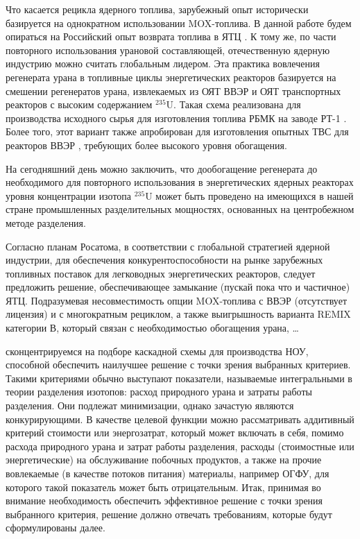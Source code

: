 Что касается рецикла ядерного топлива, зарубежный опыт исторически базируется на однократном использовании MOX-топлива. В данной работе будем опираться на Российский опыт возврата топлива в ЯТЦ \cite{international2003iaea}. К тому же, по части повторного использования урановой составляющей, отечественную ядерную индустрию можно считать глобальным лидером.  Эта практика вовлечения регенерата урана в топливные циклы энергетических реакторов базируется на смешении регенератов урана, извлекаемых из ОЯТ ВВЭР и ОЯТ транспортных реакторов с высоким содержанием $^{235}$U. Такая схема реализована для производства исходного сырья для изготовления топлива РБМК на заводе РТ-1 \cite{volkVozvratUranaIz2010}. Более того, этот вариант также апробирован для изготовления опытных ТВС для реакторов ВВЭР \cite{proselkovAnalizVozmozhnostiIspolzovaniya2003}, требующих более высокого уровня обогащения.

На сегодняшний день можно заключить, что дообогащение регенерата до необходимого для повторного использования в энергетических ядерных реакторах уровня концентрации изотопа $^{235}$U может быть проведено на имеющихся в нашей стране промышленных разделительных мощностях, основанных на центробежном методе разделения. 

Согласно планам Росатома, в соответствии с глобальной стратегией ядерной индустрии, для обеспечения конкурентоспособности на рынке зарубежных топливных поставок для легководных энергетических реакторов, следует предложить решение, обеспечивающее замыкание (пускай пока что и частичное) ЯТЦ. Подразумевая несовместимость опции MOX-топлива с ВВЭР (отсутствует лицензия) и с многократным рециклом, а также выигрышность варианта REMIX категории В, который связан с необходимостью обогащения урана, \dots

сконцентрируемся на подборе каскадной схемы для производства НОУ, способной обеспечить наилучшее решение с точки зрения выбранных критериев. Такими критериями  обычно выступают показатели, называемые интегральными в теории разделения изотопов: расход природного урана и затраты работы разделения. Они подлежат минимизации, однако зачастую являются конкурирующими. В качестве целевой функции можно рассматривать аддитивный критерий стоимости или энергозатрат, который может включать в себя, помимо расхода природного урана и затрат работы разделения, расходы (стоимостные или энергетические) на обслуживание побочных продуктов, а также на прочие вовлекаемые (в качестве потоков питания) материалы, например ОГФУ, для которого такой показатель может быть отрицательным.
Итак, принимая во внимание необходимость обеспечить эффективное решение с точки зрения выбранного критерия, решение должно отвечать требованиям, которые будут сформулированы далее.

